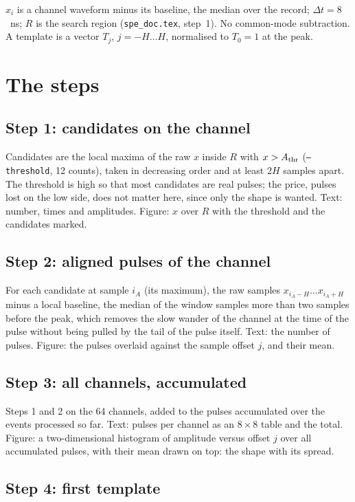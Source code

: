 \documentclass[11pt]{article}
\newcommand{\code}[1]{\texttt{#1}}
\begin{document}
$x_i$ is a channel waveform minus its baseline, the median over the
record; $\Delta t = 8$~ns; $R$ is the search region (\code{spe\_doc.tex},
step~1). No common-mode subtraction. A template is a vector $T_j$, $j =
-H \dots H$, normalised to $T_0 = 1$ at the peak.

\section{The steps}

\subsection{Step 1: candidates on the channel}

Candidates are the local maxima of the raw $x$ inside $R$ with $x >
A_{\rm thr}$ (\code{--threshold}, 12 counts), taken in decreasing order
and at least $2H$ samples apart. The threshold is high so that most
candidates are real pulses; the price, pulses lost on the low side, does
not matter here, since only the shape is wanted. Text: number, times and
amplitudes. Figure: $x$ over $R$ with the threshold and the candidates
marked.

\subsection{Step 2: aligned pulses of the channel}

For each candidate at sample $i_A$ (its maximum), the raw samples $x_{i_A
- H} \dots x_{i_A + H}$ minus a local baseline, the median of the window
samples more than two samples before the peak, which removes the slow
wander of the channel at the time of the pulse without being pulled by
the tail of the pulse itself. Text: the number of
pulses. Figure: the pulses
overlaid against the sample offset $j$, and their mean.

\subsection{Step 3: all channels, accumulated}

Steps 1 and 2 on the 64 channels, added to the pulses accumulated over
the events processed so far. Text: pulses per channel as an $8\times8$
table and the total. Figure: a two-dimensional histogram of amplitude
versus offset $j$ over all accumulated pulses, with their mean drawn on
top: the shape with its spread.

\subsection{Step 4: first template}
\end{document}
